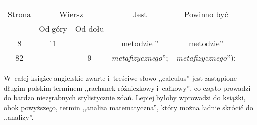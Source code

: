 \documentclass[a4paper,11pt]{article}
\begin{document}




\vspace{\spaceTwo} \vspace{\spaceThree}





\begin{center}
  \begin{tabular}{|c|c|c|c|c|}
    \hline
    & \multicolumn{2}{c|}{} & & \\
    Strona & \multicolumn{2}{c|}{Wiersz}& Jest & Powinno być \\ \cline{2-3}
    & Od góry & Od dołu &  &  \\ \hline
    8  & 11 & & metodzie '' & metodzie'' \\
    82 & &  9 & \emph{metafizycznego}''; & \emph{metafizycznego}''); \\
    \hline
  \end{tabular}
\end{center}

\vspace{\spaceTwo}








\start W~całej książce angielskie zwarte i~treściwe słowo ,,calculus''
jest zastąpione długim polskim terminem ,,rachunek różniczkowy
i~całkowy'', co często prowadzi do bardzo niezgrabnych stylistycznie
zdań. Lepiej byłoby wprowadzi do książki, obok powyższego, termin
,,analiza matematyczna'', który można ładnie skrócić do ,,analizy''.
\end{document}
